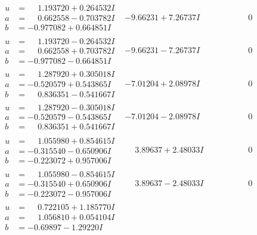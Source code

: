 \documentclass[1p]{elsarticle_modified}
\theoremstyle{definition}
\begin{document}
$$\begin{array}{c|c|c}
\begin{aligned}
u &= \phantom{-}1.193720 + 0.264532 I \\
a &= \phantom{-}0.662558 - 0.703782 I \\
b &= -0.977082 + 0.664851 I\end{aligned}
 & -9.66231 + 7.26737 I & \phantom{-0.000000 } 0 \\ \hline\begin{aligned}
u &= \phantom{-}1.193720 - 0.264532 I \\
a &= \phantom{-}0.662558 + 0.703782 I \\
b &= -0.977082 - 0.664851 I\end{aligned}
 & -9.66231 - 7.26737 I & \phantom{-0.000000 } 0 \\ \hline\begin{aligned}
u &= \phantom{-}1.287920 + 0.305018 I \\
a &= -0.520579 + 0.543865 I \\
b &= \phantom{-}0.836351 - 0.541667 I\end{aligned}
 & -7.01204 + 2.08978 I & \phantom{-0.000000 } 0 \\ \hline\begin{aligned}
u &= \phantom{-}1.287920 - 0.305018 I \\
a &= -0.520579 - 0.543865 I \\
b &= \phantom{-}0.836351 + 0.541667 I\end{aligned}
 & -7.01204 - 2.08978 I & \phantom{-0.000000 } 0 \\ \hline\begin{aligned}
u &= \phantom{-}1.055980 + 0.854615 I \\
a &= -0.315540 - 0.650906 I \\
b &= -0.223072 + 0.957006 I\end{aligned}
 & \phantom{-}3.89637 + 2.48033 I & \phantom{-0.000000 } 0 \\ \hline\begin{aligned}
u &= \phantom{-}1.055980 - 0.854615 I \\
a &= -0.315540 + 0.650906 I \\
b &= -0.223072 - 0.957006 I\end{aligned}
 & \phantom{-}3.89637 - 2.48033 I & \phantom{-0.000000 } 0 \\ \hline\begin{aligned}
u &= \phantom{-}0.722105 + 1.185770 I \\
a &= \phantom{-}1.056810 + 0.054104 I \\
b &= -0.69897 - 1.29220 I\end{aligned}

\end{array}$$
\end{document}
